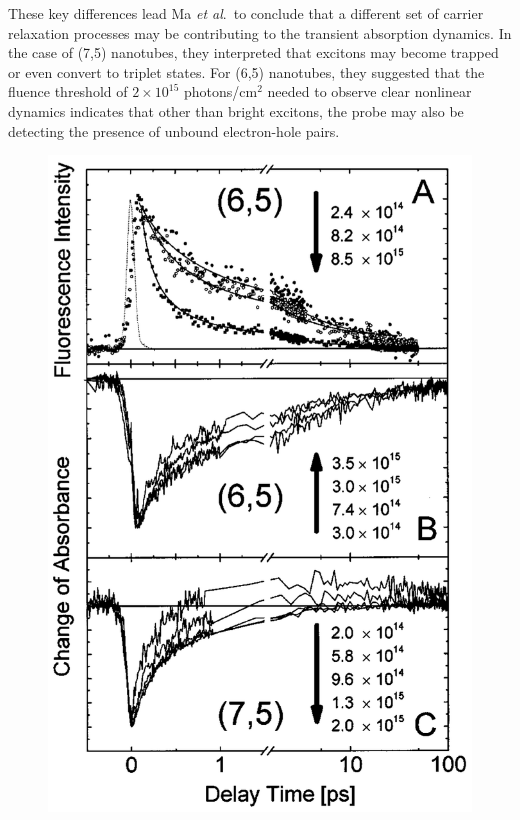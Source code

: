 These key differences lead Ma \textit{et al}.\ to conclude that a different set of carrier relaxation processes may be contributing to the transient absorption dynamics. In the case of (7,5) nanotubes, they interpreted that excitons may become trapped or even convert to triplet states. For (6,5) nanotubes, they suggested that the fluence threshold of $2 \times 10^{15}$ photons/cm$^2$ needed to observe clear nonlinear dynamics indicates that other than bright excitons, the probe may also be detecting the presence of unbound electron-hole pairs.

\begin{figure}[H]
	\centering
	\includegraphics[scale=0.3]{images/chapter_prior_works/fluorescence_abs_2_ma_2004}

\end{figure}
